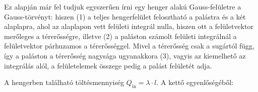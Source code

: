  Ez alapján már fel tudjuk egyszerűen írni egy henger alakú Gauss-felületre a Gauss-törvényt:
 hiszen (1) a teljes hengerfelület felosztható a palástra és a két alaplapra, ahol az alaplapon vett felületi integrál nulla, hiszen ott a felületvektor merőleges a térerősségre, illetve (2) a paláston számolt felületi integrálnál a felületvektor párhuzamos a térerősséggel. Mivel a térerősség csak a sugártól függ, így a paláston a térerősség nagysága ugyanakkora (3), vagyis az kiemelhető az integrálás alól, a felületelemek összege pedig a palást felületét adja.

 A hengerben található töltésmennyiség $Q_\text{in}=\lambda\cdot l$. A kettő egyenlőségéből:

\fi